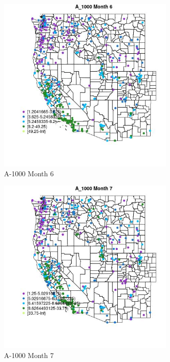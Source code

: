 \begin{figure} 
\centering  
\includegraphics[width=0.77\textwidth]{Code_Outputs/ML_input_report_ML_input_PM25_Step5_part_d_de_duplicated_aves_ML_input_MapObsMo6A_1000.jpg} 
\caption{\label{fig:ML_input_report_ML_input_PM25_Step5_part_d_de_duplicated_aves_ML_inputMapObsMo6A_1000}A-1000 Month 6} 
\end{figure} 
 

\begin{figure} 
\centering  
\includegraphics[width=0.77\textwidth]{Code_Outputs/ML_input_report_ML_input_PM25_Step5_part_d_de_duplicated_aves_ML_input_MapObsMo7A_1000.jpg} 
\caption{\label{fig:ML_input_report_ML_input_PM25_Step5_part_d_de_duplicated_aves_ML_inputMapObsMo7A_1000}A-1000 Month 7} 
\end{figure} 
 

